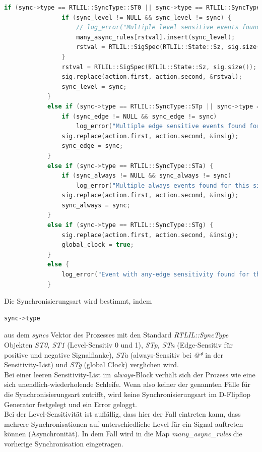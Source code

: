 \documentclass[11pt]{report}
\begin{document}
\begin{enumerate}
\begin{lstlisting}[language=C++]
			if (sync->type == RTLIL::SyncType::ST0 || sync->type == RTLIL::SyncType::ST1) {
				if (sync_level != NULL && sync_level != sync) {
					// log_error("Multiple level sensitive events found for this signal!\n");
					many_async_rules[rstval].insert(sync_level);
					rstval = RTLIL::SigSpec(RTLIL::State::Sz, sig.size());
				}
				rstval = RTLIL::SigSpec(RTLIL::State::Sz, sig.size());
				sig.replace(action.first, action.second, &rstval);
				sync_level = sync;
			}
			else if (sync->type == RTLIL::SyncType::STp || sync->type == RTLIL::SyncType::STn) {
				if (sync_edge != NULL && sync_edge != sync)
					log_error("Multiple edge sensitive events found for this signal!\n");
				sig.replace(action.first, action.second, &insig);
				sync_edge = sync;
			}
			else if (sync->type == RTLIL::SyncType::STa) {
				if (sync_always != NULL && sync_always != sync)
					log_error("Multiple always events found for this signal!\n");
				sig.replace(action.first, action.second, &insig);
				sync_always = sync;
			}
			else if (sync->type == RTLIL::SyncType::STg) {
				sig.replace(action.first, action.second, &insig);
				global_clock = true;
			}
			else {
				log_error("Event with any-edge sensitivity found for this signal!\n");
			}
\end{lstlisting}
Die Synchronisierungsart wird bestimmt, indem 
\begin{lstlisting}[language=C++]
sync->type
\end{lstlisting}
aus dem \textit{syncs} Vektor des Prozesses mit den Standard \textit{RTLIL::SyncType} Objekten \textit{ST0, ST1} (Level-Sensitiv 0 und 1), \textit{STp, STn} (Edge-Sensitiv für positive und negative Signalflanke), \textit{STa} (always-Sensitiv bei \textit{@*} in der Sensitivity-List) und \textit{STg} (global Clock) verglichen wird.\\
Bei einer leeren Sensitivity-List im \textit{always}-Block verhält sich der Prozess wie eine sich unendlich-wiederholende Schleife. Wenn also keiner der genannten Fälle für die Synchronisierungsart zutrifft, wird keine Synchronisierungsart im D-Flipflop Generator festgelegt und ein Error geloggt.\\
Bei der Level-Sensitivität ist auffällig, dass hier der Fall eintreten kann, dass mehrere Synchronisationen auf unterschiedliche Level für ein Signal auftreten können (Asynchronität). In dem Fall wird in die Map \textit{many\_async\_rules} die vorherige Synchronisation eingetragen.

\end{enumerate}
\end{document}
